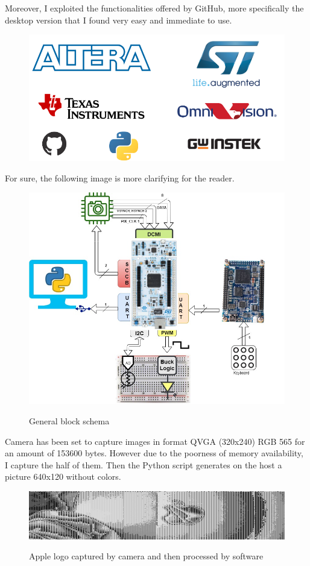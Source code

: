 Moreover, I exploited the functionalities offered by GitHub, more specifically the desktop version that I found very easy and immediate to use.
\begin{figure}[H]
\centering
\includegraphics[scale=.5]{Immagini/03}
\end{figure}
For sure, the following image is more clarifying for the reader.

\begin{figure}[H]
\centering
\includegraphics[scale=.5]{Immagini/01}
\label{01}
\caption{General block schema}
\end{figure}
Camera has been set to capture images in format QVGA (320x240) RGB 565 for an amount of 153600 bytes. However due to the poorness of memory  availability, I capture the half of them. Then the Python script generates on the host a picture 640x120 without colors.
\begin{figure}[H]
\centering
\includegraphics[scale=.04]{Immagini/04}
\label{04}
\caption{Apple logo captured by camera and then processed by software}
\end{figure}

